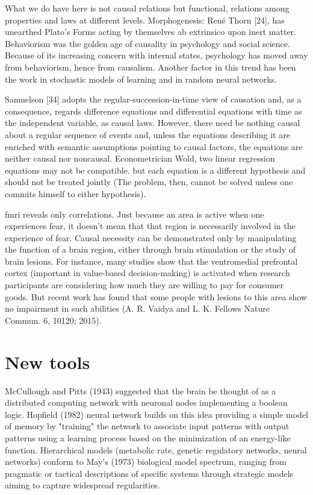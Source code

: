 \documentclass[onecollarge,runningheads]{svjour2}
\begin{document}
{%
What we do have here is not causal relations but functional, relations among properties and laws at different levels. Morphogenesis: René Thorn [24], has unearthed Plato’s Forms acting by themselves ab extrinsico upon inert matter. Behaviorism was the golden age of causality in psychology and social science.
Because of its increasing concern with internal states, psychology has moved away from behaviorism, hence from causalism. Another factor in this trend has been the work in stochastic models of learning and in random neural networks.

Samuelson [34] adopts the regular-succession-in-time view of causation  and, as a consequence, regards difference equations and differential equations with time as the independent variable, as causal laws. However, there need be nothing causal about a regular sequence of events and, unless the equations describing it are enriched with semantic assumptions pointing to causal factors, the equations are neither causal nor noncausal.
Econometrician Wold, two linear regression equations may not be compatible. but each equation is a different hypothesis and should not be treated jointly (The problem, then, cannot be solved unless one commits himself to either hypothesis). 

fmri reveals only correlations. Just because an area is active when one experiences fear, it doesn't mean that that region is necessarily involved in the experience of fear. Causal necessity can be demonstrated only by manipulating the function of a brain region, either through brain stimulation or the study of brain lesions. For instance, many studies show that the ventromedial prefrontal cortex (important in value-based decision-making) is activated when research participants are considering how much they are willing to pay for consumer goods. But recent work has found that some people with lesions to this area show no impairment in such abilities (A. R. Vaidya and L. K. Fellows Nature Commun. 6, 10120; 2015).
\section{New tools}
McCullough and Pitts (1943) suggested that the brain be thought of as a distributed computing network with neuronal nodes implementing a boolean logic. Hopfield (1982) neural network builds on this idea providing a simple model of memory by "training" the network to associate input patterns with output patterns using a learning process based on the minimization of an energy-like function.
Hierarchical models  (metabolic rate, genetic regulatory networks, neural networks) conform to May's (1973) biological model spectrum, ranging from pragmatic or tactical descriptions of specific systems through strategic models aiming to capture widespread regularities.%

}
\end{document}
